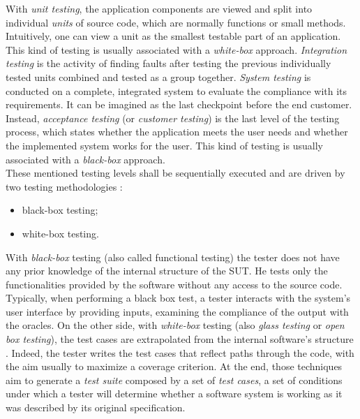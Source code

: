 With \textit{unit testing}, the application components are viewed and split into  individual \textit{units} of source code, which are normally functions or small methods. Intuitively, one can view a unit as the smallest testable part of an application. This kind of testing is usually associated with a \textit{white-box} approach. \textit{Integration testing} is the activity of finding faults after testing the previous individually tested units combined and tested as a group together. \textit{System testing} is conducted on a complete, integrated system to evaluate the compliance with its requirements. It can be imagined as the last checkpoint before the end customer. Instead, \textit{acceptance testing} (or \textit{customer testing}) is the last level of the testing process, which states whether the application meets the user needs and whether the implemented system works for the user. This kind of testing is usually associated with a \textit{black-box} approach. 
\\
These mentioned testing levels shall be sequentially executed and are driven by two testing methodologies \cite{white-box, black-box}: 
\begin{itemize}
\item black-box testing;
\item white-box testing.
\end{itemize} 
With \textit{black-box} testing (also called functional testing) the tester does not have any prior knowledge of the internal structure of the SUT. He tests only the functionalities provided by the software without any access to the source code. Typically, when performing a black box test, a tester interacts with the system's user interface by providing inputs, examining the compliance of the output with the oracles. On the other side, with \textit{white-box} testing (also \textit{glass testing} or \textit{open box testing}), the test cases are extrapolated from the internal software's structure \cite{grano}. Indeed, the tester writes the test cases that reflect paths through the code, with the aim usually to maximize a coverage criterion. 
At the end, those techniques aim to generate a \textit{test suite} composed by a set of \textit{test cases}, \ie a set of conditions under which a tester will determine whether a software system is working as it was described by its original specification.

